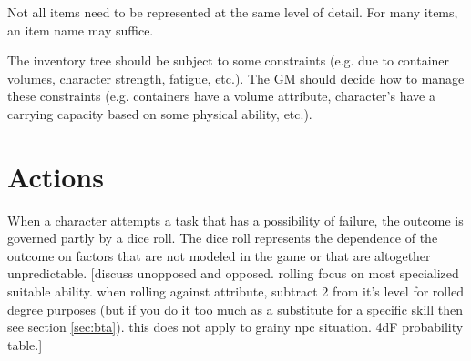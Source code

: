 \documentclass[12pt]{article}
\newcommand{\notes}[1]{{\color{Tan} #1}}
\begin{document}
Not all items need to be represented at the same level of detail.
For many items, an item name may suffice.

The inventory tree should be subject to some constraints
(e.g. due to container volumes, character strength, fatigue, etc.).
The GM should decide how to manage these constraints
(e.g. containers have a volume attribute, character's have a carrying capacity based on some physical ability, etc.).



\section{Actions}\label{sec:actions}
When a character attempts a task that has a possibility of failure, the outcome is governed partly by a dice roll.
The dice roll represents the dependence of the outcome on factors that are not modeled in the game or that are altogether unpredictable.
\notes{[discuss unopposed and opposed. rolling focus on most specialized suitable ability. when rolling against attribute, subtract 2 from it's level for rolled degree purposes (but if you do it too much as a substitute for a specific skill then see section \ref{sec:bta}). this does not apply to grainy npc situation. 4dF probability table.]}
\end{document}
